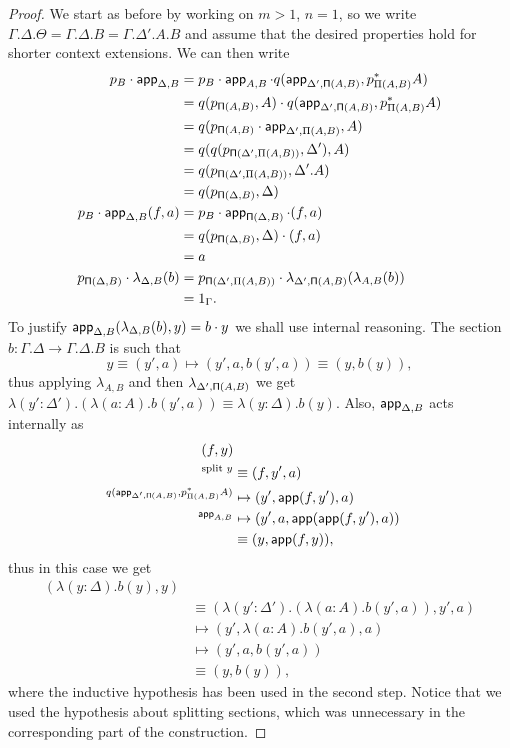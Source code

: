 \begin{proof}
  We start as before by working on $m>1$, $n=1$, so we write
  $\Gamma.\Delta.\Theta=\Gamma.\Delta.B=\Gamma.\Delta'.A.B$ and assume that
  the desired properties hold for shorter context extensions.
  We can then write
  \begin{align*}
    p_B\cdot\operatorname{\mathsf{app}}_{\Delta,B}
    &=p_B\cdot
    \operatorname{\mathsf{app}}_{A,B}\cdot
    q(\operatorname{\mathsf{app}}_{\Delta',\operatorname{\mathsf{\Pi}}(A,B)},p^*_{\Pi(A,B)}A) \\
    &=q(p_{\operatorname{\mathsf{\Pi}}(A,B)},A)\cdot
    q(\operatorname{\mathsf{app}}_{\Delta',\operatorname{\mathsf{\Pi}}(A,B)},p^*_{\Pi(A,B)}A) \\
    &=q(p_{\operatorname{\mathsf{\Pi}}(A,B)}\cdot\operatorname{\mathsf{app}}_{\Delta',\Pi(A,B)},A) \\
    &=q(q(p_{\operatorname{\mathsf{\Pi}}(\Delta',\Pi(A,B))},\Delta'),A) \\
    &=q(p_{\operatorname{\mathsf{\Pi}}(\Delta',\Pi(A,B))},\Delta'.A) \\
    &=q(p_{\operatorname{\mathsf{\Pi}}(\Delta,B)},\Delta) \\
    p_B\cdot\operatorname{\mathsf{app}}_{\Delta,B}(f,a)
    &=p_B\cdot
    \operatorname{\mathsf{app}}_{\operatorname{\mathsf{\Pi}}(\Delta,B)}\cdot
    (f,a) \\
    &=q(p_{\operatorname{\mathsf{\Pi}}(\Delta,B)},\Delta)\cdot
    (f,a) \\
    &=a \\
    p_{\operatorname{\mathsf{\Pi}}(\Delta,B)}\cdot\lambda_{\Delta,B}(b)
    &=p_{\operatorname{\mathsf{\Pi}}(\Delta',\Pi(A,B))}\cdot
    \lambda_{\Delta',\operatorname{\mathsf{\Pi}}(A,B)}(\lambda_{A,B}(b)) \\
    &=1_\Gamma.
  \end{align*}
  To justify $\operatorname{\mathsf{app}}_{\Delta,B}(\lambda_{\Delta,B}(b),y)=b\cdot y$ we shall use
  internal reasoning. The section
  $b\colon\Gamma.\Delta\rightarrow\Gamma.\Delta.B$ is
  such that\[y\equiv (y',a)\mapsto(y',a,b(y',a))\equiv(y,b(y)),\] thus
  applying $\lambda_{A,B}$ and then $\lambda_{\Delta',\operatorname{\mathsf{\Pi}}(A,B)}$ we get
  $\lambda(y':\Delta').(\lambda(a:A).b(y',a))\equiv\lambda(y:\Delta).b(y)$.
  Also, $\operatorname{\mathsf{app}}_{\Delta,B}$ acts internally as
  \begin{align*}
    (f,y) \\
    ^{\text{split } y}&\equiv(f,y',a) \\
    ^{q(\operatorname{\mathsf{app}}_{\Delta',\operatorname{\mathsf{\Pi}}(A,B)},p^*_{\Pi(A,B)}A)}&\mapsto
    (y',\operatorname{\mathsf{app}}(f,y'),a) \\
    ^{\operatorname{\mathsf{app}}_{A,B}}&\mapsto
    (y',a,\operatorname{\mathsf{app}}(\operatorname{\mathsf{app}}(f,y'),a)) \\
    &\equiv(y,\operatorname{\mathsf{app}}(f,y)),
  \end{align*}
  thus in this case we get
  \begin{align*}
    (\lambda(y:\Delta).b(y),y) \\
    &\equiv(\lambda(y':\Delta').(\lambda(a:A).b(y',a)),y',a) \\
    &\mapsto
    (y',\lambda(a:A).b(y',a),a) \\
    &\mapsto
    (y',a,b(y',a)) \\
    &\equiv(y,b(y)),
  \end{align*}
  where the inductive hypothesis has been used in the second step. Notice that
  we used the hypothesis about splitting sections, which was unnecessary in the
  corresponding part of the construction.
  

\end{proof}
